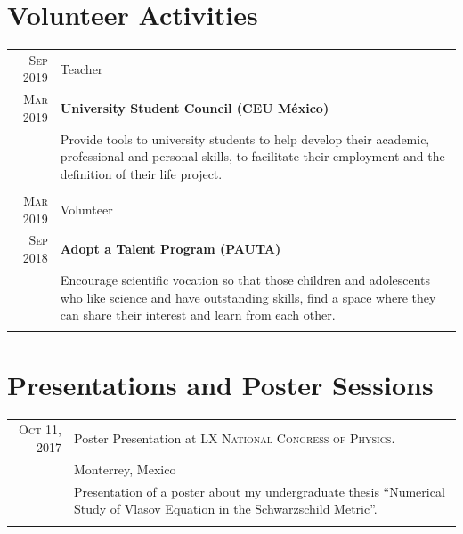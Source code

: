 \documentclass[a4paper,10pt]{article} %
\begin{document}
\section{Volunteer Activities}
\bigskip
\begin{tabular}{r|p{11cm}}

	
	
	\textsc{Sep 2019} & Teacher\\
	\textsc{Mar 2019} &\footnotesize{\textbf{University Student Council (CEU México)}}\\
	&\footnotesize{Provide tools to university students to help develop their academic, professional and personal skills, to facilitate their employment and the definition of their life project.}\\
	\multicolumn{2}{c}{} \\	
	

	\textsc{Mar 2019} & Volunteer\\
	\textsc{Sep 2018} &\footnotesize{\textbf{Adopt a Talent Program (PAUTA)}}\\
	&\footnotesize{Encourage scientific vocation so that those children and adolescents who like science and have outstanding skills, find a space where they can share their interest and learn from each other.}\\
	\multicolumn{2}{c}{} \\	
	

\end{tabular}


\section{Presentations and Poster Sessions}
\bigskip
\begin{tabular}{r|p{11cm}}
	
	\textsc{Oct 11, 2017} & Poster Presentation at \textsc{LX National Congress of Physics.}\\
	&\small Monterrey, Mexico\\
	&\footnotesize{Presentation of a poster about my undergraduate thesis ``Numerical Study of Vlasov Equation in the Schwarzschild Metric''.}\\
	\multicolumn{2}{c}{} \\
	
\end{tabular}
\end{document}
